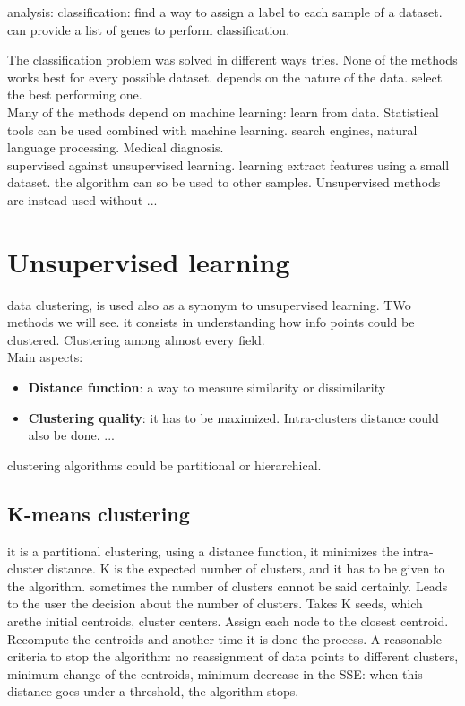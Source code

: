 analysis:
classification: find a way to assign a label to each sample of a dataset. can provide a list of genes to perform classification. 

The classification problem was solved in different ways tries. None of the methods works best for every possible dataset. depends on the nature of the data. select the best performing one. \\

Many of the methods depend on machine learning: learn from data. Statistical tools can be used combined with machine learning. search engines, natural language processing. Medical diagnosis.\\

supervised against unsupervised learning. learning extract features using a small dataset. the algorithm can so be used to other samples. Unsupervised methods are instead used without ... %


\section{Unsupervised learning}

data clustering, is used also as a synonym to unsupervised learning. TWo methods we will see.
it consists in understanding how info points could be clustered. Clustering among almost every field. \\
Main aspects:
\begin{itemize}
	\item \textbf{Distance function}: a way to measure similarity or dissimilarity
	\item \textbf{Clustering quality}: it has to be maximized. Intra-clusters distance could also be done.
	...
\end{itemize}

clustering algorithms could be partitional or hierarchical. 


\subsection{K-means clustering} 
it is a partitional clustering, using a distance function, it minimizes the intra-cluster distance. K is the expected number of clusters, and it has to be given to the algorithm. sometimes the number of clusters cannot be said certainly. Leads to the user the decision about the number of clusters.
Takes K seeds, which arethe initial centroids, cluster centers. Assign each node to the closest centroid. Recompute the centroids and another time it is done the process.
A reasonable criteria to stop the algorithm: no reassignment of data points to different clusters, minimum change of the centroids, minimum decrease in the SSE: when this distance goes under a threshold, the algorithm stops. 

